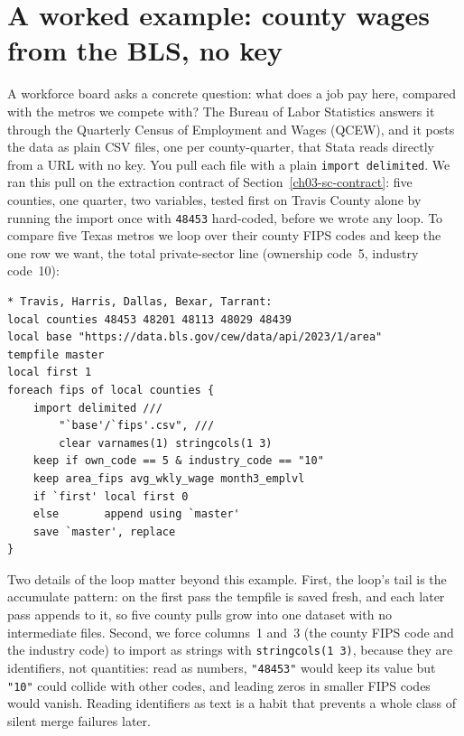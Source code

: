 \documentclass[
    a4paper,
    fontsize=10pt,
    twoside=true,
    numbers=noenddot,
]{kaobook}
\begin{document}
\section{A worked example: county wages from the BLS, no key}\label{sec:qcew}
A workforce board asks a concrete question: what does a job pay here, compared with the metros we compete with? The Bureau of Labor Statistics answers it through the Quarterly Census of Employment and Wages (QCEW), and it posts the data as plain CSV files, one per county-quarter, that Stata reads directly from a URL with no key. You pull each file with a plain \texttt{import delimited}. We ran this pull on the extraction contract of Section~\ref{ch03-sc-contract}: five counties, one quarter, two variables, tested first on Travis County alone by running the import once with \texttt{48453} hard-coded, before we wrote any loop. To compare five Texas metros we loop over their county FIPS codes and keep the one row we want, the total private-sector line (ownership code~5, industry code~10):
\par
{\footnotesize
\begin{verbatim}
* Travis, Harris, Dallas, Bexar, Tarrant:
local counties 48453 48201 48113 48029 48439
local base "https://data.bls.gov/cew/data/api/2023/1/area"
tempfile master
local first 1
foreach fips of local counties {
    import delimited ///
        "`base'/`fips'.csv", ///
        clear varnames(1) stringcols(1 3)
    keep if own_code == 5 & industry_code == "10"
    keep area_fips avg_wkly_wage month3_emplvl
    if `first' local first 0
    else       append using `master'
    save `master', replace
}
\end{verbatim}
}
Two details of the loop matter beyond this example. First, the loop's tail is the accumulate pattern: on the first pass the tempfile is saved fresh, and each later pass appends to it, so five county pulls grow into one dataset with no intermediate files. Second, we force columns~1 and~3 (the county FIPS code and the industry code) to import as strings with \texttt{stringcols(1 3)}, because they are identifiers, not quantities: read as numbers, \texttt{"48453"} would keep its value but \texttt{"10"} could collide with other codes, and leading zeros in smaller FIPS codes would vanish. Reading identifiers as text is a habit that prevents a whole class of silent merge failures later.
\end{document}
